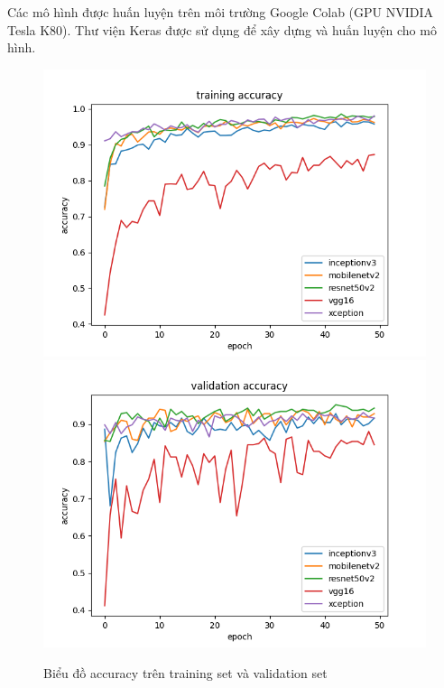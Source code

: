 \documentclass[a4paper,14pt]{extarticle}
\begin{document}
	Các mô hình được huấn luyện trên môi trường Google Colab (GPU NVIDIA Tesla K80). Thư viện Keras được sử dụng để xây dựng và huấn luyện cho mô hình.

	\begin{figure}[H]
		\centering
		\includegraphics[scale=0.45]{images/accuracy.png}
		\includegraphics[scale=0.45]{images/val_accuracy.png}
		\caption{Biểu đồ accuracy trên training set và validation set}
	\end{figure}
\end{document}
